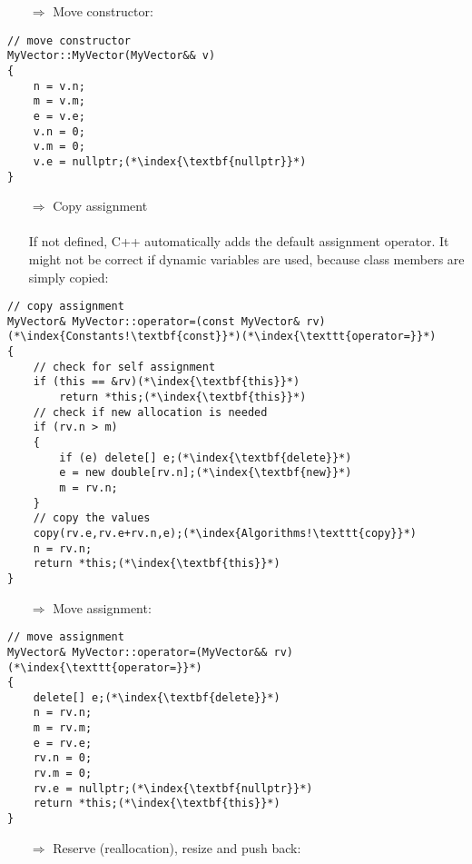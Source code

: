 \documentclass[10pt]{article}
\begin{document}
\begin{enumerate}
\item[$\Rightarrow$] Move constructor:
\end{enumerate}
\begin{lstlisting}
// move constructor
MyVector::MyVector(MyVector&& v)
{
    n = v.n;
    m = v.m;
    e = v.e;
    v.n = 0;
    v.m = 0;
    v.e = nullptr;(*\index{\textbf{nullptr}}*)
}
\end{lstlisting}
\begin{enumerate}
\item[$\Rightarrow$] Copy assignment\\ \\ If not defined, C++ automatically adds  the default assignment operator.
It might not be correct if dynamic variables are used, because class members are simply copied:
\end{enumerate}
\begin{lstlisting}
// copy assignment
MyVector& MyVector::operator=(const MyVector& rv)(*\index{Constants!\textbf{const}}*)(*\index{\texttt{operator=}}*)
{
    // check for self assignment
    if (this == &rv)(*\index{\textbf{this}}*)
        return *this;(*\index{\textbf{this}}*)
    // check if new allocation is needed
    if (rv.n > m)
    {
        if (e) delete[] e;(*\index{\textbf{delete}}*)
        e = new double[rv.n];(*\index{\textbf{new}}*)
        m = rv.n;
    }
    // copy the values
    copy(rv.e,rv.e+rv.n,e);(*\index{Algorithms!\texttt{copy}}*)
    n = rv.n;
    return *this;(*\index{\textbf{this}}*)
}
\end{lstlisting}
\begin{enumerate}
\item[$\Rightarrow$] Move assignment:
\end{enumerate}
\begin{lstlisting}
// move assignment
MyVector& MyVector::operator=(MyVector&& rv)(*\index{\texttt{operator=}}*)
{
    delete[] e;(*\index{\textbf{delete}}*)
    n = rv.n;
    m = rv.m;
    e = rv.e;
    rv.n = 0;
    rv.m = 0;
    rv.e = nullptr;(*\index{\textbf{nullptr}}*)
    return *this;(*\index{\textbf{this}}*)
}
\end{lstlisting}
\begin{enumerate}
\item[$\Rightarrow$] Reserve (reallocation), resize and push back:
\end{enumerate}
\end{document}
